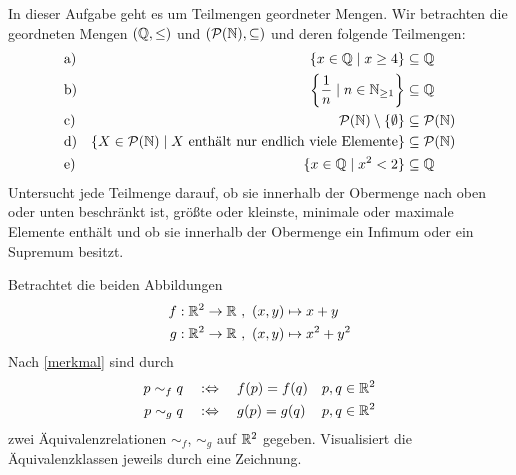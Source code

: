 \begin{aufg}[Schranken]
    In dieser Aufgabe geht es um Teilmengen geordneter Mengen. Wir betrachten die geordneten Mengen $(\mathbb Q,\le)$ und $(\mathcal P(\mathbb N),\subseteq)$ und deren folgende Teilmengen:
    \begin{align*}
        & \text{a)} & \{x\in \mathbb Q \mid x\ge 4\} & \subseteq \mathbb Q \\
        & \text{b)} & \left\{\frac{1}{n}\mid n\in \mathbb N_{\ge 1}\right\} & \subseteq \mathbb Q \\
        & \text{c)} & \mathcal P(\mathbb N)\setminus \{\emptyset\} & \subseteq \mathcal P(\mathbb N) \\
        & \text{d)} & \{X\in\mathcal P(\mathbb N)\mid X\ \text{enthält nur endlich viele Elemente}\} & \subseteq \mathcal P(\mathbb N) \\
        & \text{e)} & \{x\in \mathbb Q \mid x^2<2\} & \subseteq \mathbb Q
    \end{align*}
    Untersucht jede Teilmenge darauf, ob sie innerhalb der Obermenge nach oben oder unten beschränkt ist, größte oder kleinste, minimale oder maximale Elemente enthält und ob sie innerhalb der Obermenge ein Infimum oder ein Supremum besitzt.
\end{aufg}


\begin{aufg}[Äquivalenzklassen]
    Betrachtet die beiden Abbildungen
    \begin{align*}
        f : \mathbb R^2 \to \mathbb R \ &,\ (x,y) \mapsto x+y \\
        g : \mathbb R^2 \to \mathbb R \ &,\ (x,y) \mapsto x^2+y^2
    \end{align*}
    Nach \cref{merkmal} sind durch
    \begin{align*}
        p\sim_f q \quad &:\Leftrightarrow\quad f(p)=f(q) && p,q\in \mathbb R^2 \\
        p\sim_g q \quad &:\Leftrightarrow\quad g(p)=g(q) && p,q\in \mathbb R^2
    \end{align*}
    zwei Äquivalenzrelationen $\sim_f$, $\sim_g$ auf $\mathbb R^2$ gegeben. Visualisiert die Äquivalenzklassen jeweils durch eine Zeichnung.
\end{aufg}

